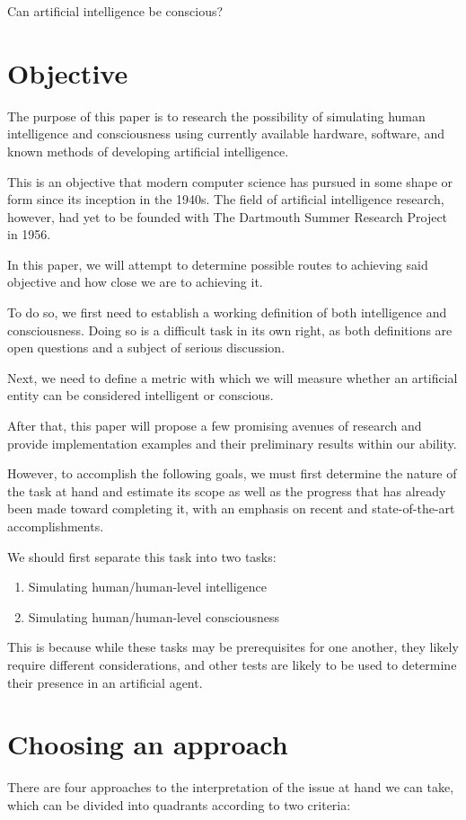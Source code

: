 \documentclass[masterthesis]{fer}
\begin{document}
Can artificial intelligence be conscious?
\section{Objective}
The purpose of this paper is to research the possibility of simulating human intelligence and consciousness using currently available hardware, software, and known methods of developing artificial intelligence.

This is an objective that modern computer science has pursued in some shape or form since its inception in the 1940s. The field of artificial intelligence research, however, had yet to be founded with The Dartmouth Summer Research Project in 1956.

In this paper, we will attempt to determine possible routes to achieving said objective and how close we are to achieving it.

To do so, we first need to establish a working definition of both intelligence and consciousness. Doing so is a difficult task in its own right, as both definitions are open questions and a subject of serious discussion.

Next, we need to define a metric with which we will measure whether an artificial entity can be considered intelligent or conscious.

After that, this paper will propose a few promising avenues of research and provide implementation examples and their preliminary results within our ability.

However, to accomplish the following goals, we must first determine the nature of the task at hand and estimate its scope as well as the progress that has already been made toward completing it, with an emphasis on recent and state-of-the-art accomplishments.

We should first separate this task into two tasks:

\begin{enumerate}
\item Simulating human/human-level intelligence
\item Simulating human/human-level consciousness
\end{enumerate}

This is because while these tasks may be prerequisites for one another, they likely require different considerations, and other tests are likely to be used to determine their presence in an artificial agent.
\section{Choosing an approach}
There are four approaches to the interpretation of the issue at hand we can take, which can be divided into quadrants according to two criteria:
\end{document}
